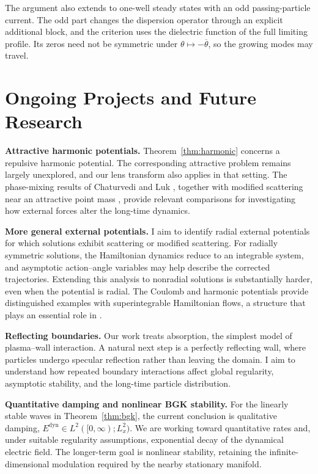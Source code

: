 \documentclass[10pt,reqno]{amsart}
\begin{document}
The argument also extends to one-well steady states with an odd passing-particle current. The odd part changes the dispersion operator through an explicit additional block, and the criterion uses the dielectric function of the full limiting profile. Its zeros need not be symmetric under $\theta\mapsto-\overline\theta$, so the growing modes may travel.

\section*{Ongoing Projects and Future Research}

\noindent\textbf{Attractive harmonic potentials.}
Theorem~\ref{thm:harmonic} concerns a repulsive harmonic potential. The corresponding attractive problem remains largely unexplored, and our lens transform also applies in that setting. The phase-mixing results of Chaturvedi and Luk \cite{CL22,CL24}, together with modified scattering near an attractive point mass \cite{KW25}, provide relevant comparisons for investigating how external forces alter the long-time dynamics.

\smallskip
\noindent\textbf{More general external potentials.}
I aim to identify radial external potentials for which solutions exhibit scattering or modified scattering. For radially symmetric solutions, the Hamiltonian dynamics reduce to an integrable system, and asymptotic action--angle variables \cite{PW21,PWY22} may help describe the corrected trajectories. Extending this analysis to nonradial solutions is substantially harder, even when the potential is radial. The Coulomb and harmonic potentials provide distinguished examples with superintegrable Hamiltonian flows, a structure that plays an essential role in \cite{PWY22}.

\smallskip
\noindent\textbf{Reflecting boundaries.}
Our work \cite{HPS24} treats absorption, the simplest model of plasma--wall interaction. A natural next step is a perfectly reflecting wall, where particles undergo specular reflection rather than leaving the domain. I aim to understand how repeated boundary interactions affect global regularity, asymptotic stability, and the long-time particle distribution.

\smallskip
\noindent\textbf{Quantitative damping and nonlinear BGK stability.}
For the linearly stable waves in Theorem~\ref{thm:bgk}, the current conclusion is qualitative damping, $E^{\mathrm{dyn}}\in L^2([0,\infty);L_x^2)$. We are working toward quantitative rates and, under suitable regularity assumptions, exponential decay of the dynamical electric field. The longer-term goal is nonlinear stability, retaining the infinite-dimensional modulation required by the nearby stationary manifold.
\end{document}
